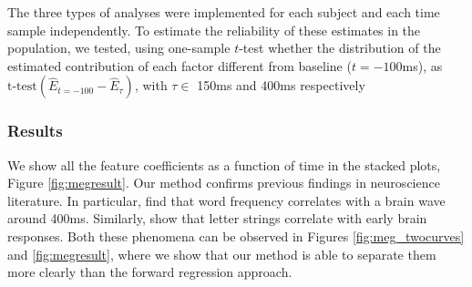 The three types of analyses were implemented for each subject and each time
sample independently.  To estimate the reliability of these estimates in the
population, we tested, using one-sample $t$-test whether the distribution of
the estimated contribution of each factor different from baseline ($t=-100$ms),
as $\text{t-test}(\hat E_{t=-100} - \hat E_{\tau})$, with $\tau \in $ 150ms and
400ms respectively


\subsubsection{Results}

We show all the feature coefficients as a function of time in the stacked plots,
Figure \ref{fig:megresult}. Our method confirms previous findings in
neuroscience literature. In particular, \cite{kutas2011thirty} find that word
frequency correlates with a brain wave around 400ms. Similarly,
\cite{pegado2014timing} show that letter strings correlate with early brain
responses. Both these phenomena can be observed in Figures
\ref{fig:meg_twocurves} and \ref{fig:megresult}, where we show that our
method is able to separate them more clearly than the forward regression
approach.


